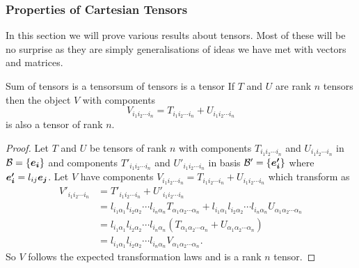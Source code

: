 \documentclass[a4paper]{article}
\newcommand{\basis}{\mathcal{B}}
\newcommand{\veprime}[1]{\vv{e'_{#1}}}
\newcommand{\nindices}[2]{{ {#1}_1 {#1}_2 \dotsm {#1}_{#2} }}
\begin{document}
    \subsubsection{Properties of Cartesian Tensors}
    In this section we will prove various results about tensors.
    Most of these will be no surprise as they are simply generalisations of ideas we have met with vectors and matrices.
    \begin{lemma}{Sum of tensors is a tensor}{sum of tensors is a tensor}
        If \(T\) and \(U\) are rank \(n\) tensors then the object \(V\) with components
        \[V_{\nindices{i}{n}} = T_{\nindices{i}{n}} + U_{\nindices{i}{n}}\]
        is also a tensor of rank \(n\).
    \end{lemma}
    \begin{proof}
        Let \(T\) and \(U\) be tensors of rank \(n\) with components \(T_\nindices{i}{n}\) and \(U_\nindices{i}{n}\) in \(\basis = \{\ve{i}\}\) and components \(T'_\nindices{i}{n}\) and \(U'_\nindices{i}{n}\) in basis \(\basis' = \{\veprime{i}\}\) where \(\veprime{i} = l_{ij}\ve{j}\).
        Let \(V\) have components \(V_\nindices{i}{n} = T_\nindices{i}{n} + U_\nindices{i}{n}\) which transform as
        \begin{align*}
            V'_{\nindices{i}{n}} &= T'_\nindices{i}{n} + U'_\nindices{i}{n}\\
            &= l_{i_1\alpha_1}l_{i_2\alpha_2} \dotsm l_{i_n\alpha_n} T_\nindices{\alpha}{n} + l_{i_1\alpha_1}l_{i_2\alpha_2} \dotsm l_{i_n\alpha_n} U_\nindices{\alpha}{n}\\
            &= l_{i_1\alpha_1}l_{i_2\alpha_2} \dotsm l_{i_n\alpha_n} (T_\nindices{\alpha}{n} + U_\nindices{\alpha}{n})\\
            &=l_{i_1\alpha_1}l_{i_2\alpha_2} \dotsm l_{i_n\alpha_n} V_\nindices{\alpha}{n}.
        \end{align*}
        So \(V\) follows the expected transformation laws and is a rank \(n\) tensor.
    \end{proof}
\end{document}
